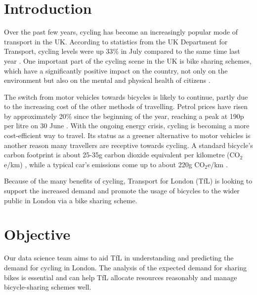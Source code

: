 \section{Introduction}
Over the past few years, cycling has become an increasingly popular mode of transport in the UK. According to statistics from the UK Department for Transport, cycling levels were up 33$\%$ in July compared to the same time last year \cite{dftstat}. One important part of the cycling scene in the UK is bike sharing schemes, which have a significantly positive impact on the country, not only on the environment but also on the mental and physical health of citizens \cite{nationalimapct}.

The switch from motor vehicles towards bicycles is likely to continue, partly due to the increasing cost of the other methods of travelling. Petrol prices have risen by approximately 20$\%$ since the beginning of the year, reaching a peak at 190p per litre on 30 June \cite{petrol}. With the ongoing energy crisis, cycling is becoming a more cost-efficient way to travel. Its status as a greener alternative to motor vehicles is another reason many travellers are receptive towards cycling. A standard bicycle's carbon footprint is about 25-35g carbon dioxide equivalent per kilometre (CO$_2$e/km) \cite{cycleco2}, while a typical car's emissions come up to about 220g CO$_2$e/km \cite{carco2}. 

Because of the many benefits of cycling, Transport for London (TfL) is looking to support the increased demand and promote the usage of bicycles to the wider public in London via a bike sharing scheme. 


\section{Objective}
Our data science team aims to aid TfL in understanding and predicting the demand for cycling in London. The analysis of the expected demand for sharing bikes is essential and can help TfL allocate resources reasonably and manage bicycle-sharing schemes well.

